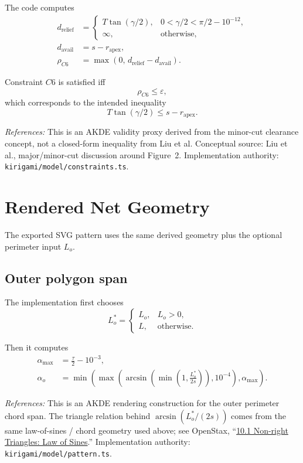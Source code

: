 \documentclass[11pt]{article}
\newcommand{\formularefs}[1]{%
\par\smallskip
\noindent\footnotesize\textit{References: }#1
\par\smallskip\normalsize
}
\begin{document}
The code computes
\begin{align}
d_{\mathrm{relief}} &=
\begin{cases}
T\tan(\gamma/2), & 0<\gamma/2<\pi/2-10^{-12},\\[4pt]
\infty, & \text{otherwise,}
\end{cases} \\
d_{\mathrm{avail}} &= s-r_{\mathrm{apex}}, \\
\rho_{C6} &= \max(0,\,d_{\mathrm{relief}} - d_{\mathrm{avail}}).
\end{align}

Constraint $C6$ is satisfied iff
\[
\rho_{C6} \le \varepsilon,
\]
which corresponds to the intended inequality
\[
T\tan(\gamma/2) \le s-r_{\mathrm{apex}}.
\]

\formularefs{This is an AKDE validity proxy derived from the minor-cut clearance concept, not a closed-form inequality from Liu et al. Conceptual source: Liu et al., major/minor-cut discussion around Figure~2. Implementation authority: \texttt{kirigami/model/constraints.ts}.}

\section{Rendered Net Geometry}

The exported SVG pattern uses the same derived geometry plus the optional perimeter
input $L_o$.

\subsection{Outer polygon span}

The implementation first chooses
\[
L_o^\ast =
\begin{cases}
L_o, & L_o>0,\\
L, & \text{otherwise.}
\end{cases}
\]

Then it computes
\begin{align}
\alpha_{\max} &= \frac{\tau}{2} - 10^{-3}, \\
\alpha_o &= \min\!\left(
\max\!\left(
\arcsin\!\left(\min\!\left(1,\frac{L_o^\ast}{2s}\right)\right),
10^{-4}
\right),
\alpha_{\max}
\right).
\end{align}

\formularefs{This is an AKDE rendering construction for the outer perimeter chord span. The triangle relation behind \(\arcsin(L_o^\ast/(2s))\) comes from the same law-of-sines / chord geometry used above; see OpenStax, ``\href{https://openstax.org/books/algebra-and-trigonometry-2e/pages/10-1-non-right-triangles-law-of-sines}{10.1 Non-right Triangles: Law of Sines}.'' Implementation authority: \texttt{kirigami/model/pattern.ts}.}
\end{document}
